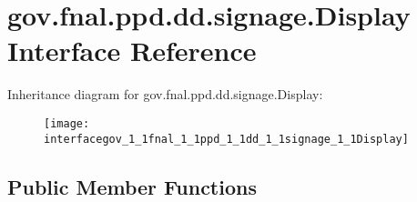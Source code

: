 \hypertarget{interfacegov_1_1fnal_1_1ppd_1_1dd_1_1signage_1_1Display}{\section{gov.\-fnal.\-ppd.\-dd.\-signage.\-Display Interface Reference}
\label{interfacegov_1_1fnal_1_1ppd_1_1dd_1_1signage_1_1Display}
}
Inheritance diagram for gov.\-fnal.\-ppd.\-dd.\-signage.\-Display\-:\begin{figure}[H]
\begin{center}
\leavevmode
\texttt{[image: interfacegov\_1\_1fnal\_1\_1ppd\_1\_1dd\_1\_1signage\_1\_1Display]}
\end{center}
\end{figure}
\subsection*{Public Member Functions}
